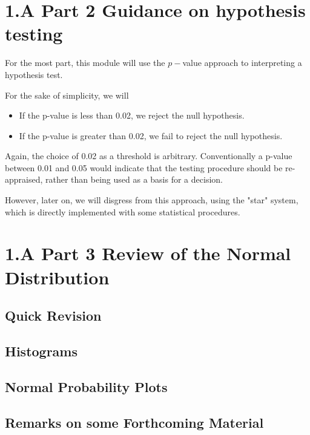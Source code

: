 

\section{1.A Part 2 Guidance on hypothesis testing}

For the most part, this module will use the $p-$value approach to interpreting a hypothesis test.

For the sake of simplicity, we will 
\begin{itemize}
\item If the p-value is less than 0.02, we reject the null hypothesis.
\item If the p-value is greater than 0.02, we fail to reject the null hypothesis.
\end{itemize}

Again, the choice of 0.02 as a threshold is arbitrary. Conventionally a p-value between 0.01 and 0.05 would 
indicate that the testing procedure should be re-appraised, rather than being used as a basis for a decision.

However, later on, we will disgress from this approach, using the "star" system, which is directly implemented 
with some statistical procedures.



\section{1.A Part 3 Review of the Normal Distribution}


\subsection{Quick Revision}

\subsection{Histograms}

\subsection{Normal Probability Plots}

\subsection{Remarks on some Forthcoming Material}


